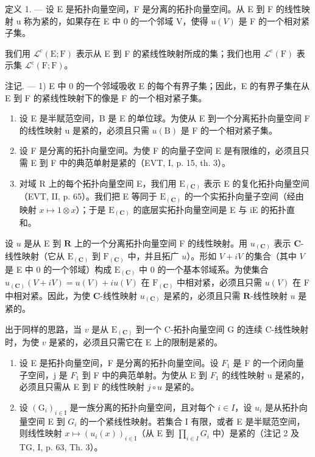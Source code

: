 定义 1. --- 设 E 是拓扑向量空间，F 是分离的拓扑向量空间。从 E 到 F 的线性映射 u 称为紧的，如果存在 E 中 0 的一个邻域 V，使得 \(u(V)\) 是 F 的一个相对紧子集。

我们用 \(\mathcal{L}^{\mathrm{c}}(\mathrm{E};\mathrm{F})\) 表示从 E 到 F 的紧线性映射所成的集；我们也用 \(\mathcal{L}^{\mathrm{c}}(\mathrm{F})\) 表示集 \(\mathcal{L}^{\mathrm{c}}(\mathrm{F};\mathrm{F})\)。

注记. --- 1) E 中 0 的一个邻域吸收 E 的每个有界子集；因此，E 的有界子集在从 E 到 F 的紧线性映射下的像是 F 的一个相对紧子集。

\begin{enumerate}
\def\labelenumi{\arabic{enumi})}
\setcounter{enumi}{1}
\item
  设 E 是半赋范空间，B 是 E 的单位球。为使从 E 到一个分离拓扑向量空间 F 的线性映射 u 是紧的，必须且只需 \(u(\mathrm{B})\) 是 F 的一个相对紧子集。
\item
  设 F 是分离的拓扑向量空间。为使 F 的向量子空间 E 是有限维的，必须且只需 E 到 F 中的典范单射是紧的（EVT, I, p. 15, th. 3）。
\item
  对域 R 上的每个拓扑向量空间 E，我们用 \(\mathrm{E}_{(\mathbf{C})}\) 表示 E 的复化拓扑向量空间（EVT, II, p. 65）。我们把 E 等同于 \(\mathrm{E}_{(\mathbf{C})}\) 的一个实拓扑向量子空间（经由映射 \(x \mapsto 1 \otimes x\)）；于是 \(\mathrm{E}_{(\mathbf{C})}\) 的底层实拓扑向量空间是 E 与 iE 的拓扑直和。
\end{enumerate}

设 \(u\) 是从 E 到 \(\mathbf{R}\) 上的一个分离拓扑向量空间 F 的线性映射。用 \(u_{(\mathbf{C})}\) 表示 \(\mathbf{C}\)-线性映射（它从 \(\mathrm{E}_{(\mathbf{C})}\) 到 \(\mathrm{F}_{(\mathbf{C})}\) 中，并且拓广 \(u\)）。形如 \(V + iV\) 的集合（其中 \(V\) 是 E 中 0 的一个邻域）构成 \(\mathrm{E}_{(\mathbf{C})}\) 中 0 的一个基本邻域系。为使集合 \(u_{(\mathbf{C})}(V + iV) = u(V) + iu(V)\) 在 \(\mathrm{F}_{(\mathbf{C})}\) 中相对紧，必须且只需 \(u(V)\) 在 F 中相对紧。因此，为使 \(\mathbf{C}\)-线性映射 \(u_{(\mathbf{C})}\) 是紧的，必须且只需 \(\mathbf{R}\)-线性映射 \(u\) 是紧的。

出于同样的思路，当 \(v\) 是从 \(\mathrm{E}_{(\mathbf{C})}\) 到一个 C-拓扑向量空间 G 的连续 C-线性映射时，为使 \(v\) 是紧的，必须且只需它在 E 上的限制是紧的。

\begin{enumerate}
\def\labelenumi{\arabic{enumi})}
\setcounter{enumi}{4}
\item
  设 E 是拓扑向量空间，F 是分离的拓扑向量空间。设 \(F_{1}\) 是 F 的一个闭向量子空间，j 是 \(F_{1}\) 到 F 中的典范单射。为使从 E 到 \(F_{1}\) 的线性映射 u 是紧的，必须且只需从 E 到 F 的线性映射 \(j \circ u\) 是紧的。
\item
  设 \((\mathrm{G}_{i})_{i\in\mathrm{I}}\) 是一族分离的拓扑向量空间，且对每个 \(i\in I\)，设 \(u_{i}\) 是从拓扑向量空间 E 到 \(G_{i}\) 的一个紧线性映射。若集合 I 有限，或者 E 是半赋范空间，则线性映射 \(x\mapsto(u_{i}(x))_{i\in\mathrm{I}}\)（从 E 到 \(\prod_{i\in I}G_{i}\) 中）是紧的（注记 2 及 TG, I, p. 63, Th. 3）。
\end{enumerate}

